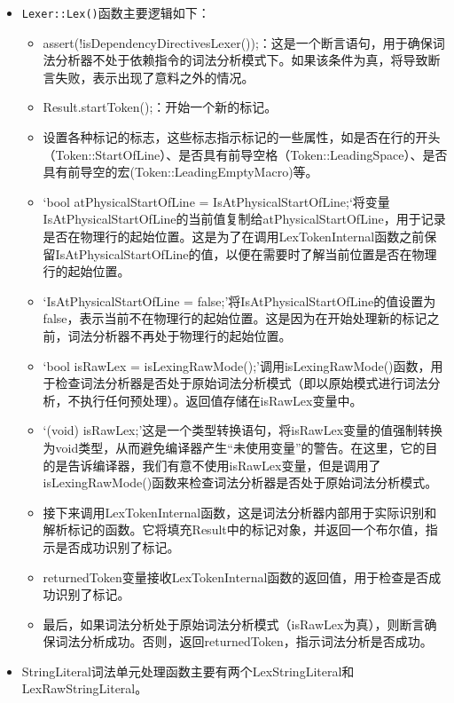 \documentclass[a4paper, justified]{tufte-handout}
\begin{document}
\begin{solution}
  \begin{itemize}
    \item \texttt{Lexer::Lex()}函数主要逻辑如下：
      \begin{itemize}
        \item assert(!isDependencyDirectivesLexer());：这是一个断言语句，用于确保词法分析器不处于依赖指令的词法分析模式下。如果该条件为真，将导致断言失败，表示出现了意料之外的情况。
        \item Result.startToken();：开始一个新的标记。
        \item 设置各种标记的标志，这些标志指示标记的一些属性，如是否在行的开头（Token::StartOfLine）、是否具有前导空格（Token::LeadingSpace）、是否具有前导空的宏(Token::LeadingEmptyMacro)等。
        \item `bool atPhysicalStartOfLine = IsAtPhysicalStartOfLine;`将变量IsAtPhysicalStartOfLine的当前值复制给atPhysicalStartOfLine，用于记录是否在物理行的起始位置。这是为了在调用LexTokenInternal函数之前保留IsAtPhysicalStartOfLine的值，以便在需要时了解当前位置是否在物理行的起始位置。
        \item `IsAtPhysicalStartOfLine = false;'将IsAtPhysicalStartOfLine的值设置为false，表示当前不在物理行的起始位置。这是因为在开始处理新的标记之前，词法分析器不再处于物理行的起始位置。
        \item `bool isRawLex = isLexingRawMode();'调用isLexingRawMode()函数，用于检查词法分析器是否处于原始词法分析模式（即以原始模式进行词法分析，不执行任何预处理）。返回值存储在isRawLex变量中。
        \item `(void) isRawLex;'这是一个类型转换语句，将isRawLex变量的值强制转换为void类型，从而避免编译器产生“未使用变量”的警告。在这里，它的目的是告诉编译器，我们有意不使用isRawLex变量，但是调用了isLexingRawMode()函数来检查词法分析器是否处于原始词法分析模式。
        \item 接下来调用LexTokenInternal函数，这是词法分析器内部用于实际识别和解析标记的函数。它将填充Result中的标记对象，并返回一个布尔值，指示是否成功识别了标记。
        \item returnedToken变量接收LexTokenInternal函数的返回值，用于检查是否成功识别了标记。
        \item 最后，如果词法分析处于原始词法分析模式（isRawLex为真），则断言确保词法分析成功。否则，返回returnedToken，指示词法分析是否成功。
      \end{itemize}
    \item StringLiteral词法单元处理函数主要有两个LexStringLiteral和LexRawStringLiteral。

\end{itemize}
\end{solution}
\end{document}
